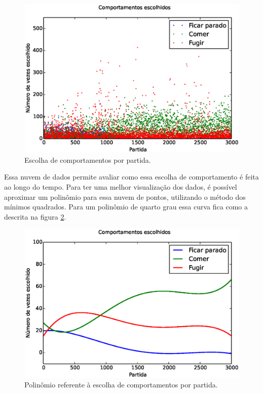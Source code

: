 \begin{figure}[h]
    \centering
    \includegraphics[width=\linewidth]{images/3_behaviors_small_map/chosen_behaviors}
    \caption{Escolha de comportamentos por partida.}
    \label{img:3ComportamentosMapaPequeno:ComportamentosEscolhidos}
\end{figure}

Essa nuvem de dados permite avaliar como essa escolha de comportamento é feita ao longo do tempo. Para ter uma melhor visualização dos dados, é possível aproximar um polinômio para essa nuvem de pontos, utilizando o método dos mínimos quadrados. Para um polinômio de quarto grau essa curva fica como a descrita na figura \ref{img:3ComportamentosMapaPequeno:ComportamentosEscolhidosPolinômio}.

\begin{figure}[h]
    \centering
    \includegraphics[width=\linewidth]{images/3_behaviors_small_map/chosen_behaviors_pol}
    \caption{Polinômio referente à escolha de comportamentos por partida.}
    \label{img:3ComportamentosMapaPequeno:ComportamentosEscolhidosPolinômio}
\end{figure}

